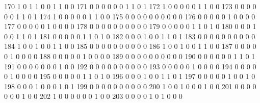 \documentclass[compress,8pt]{beamer}
\begin{document}
\begin{frame}
\begin{Schunk}
  170      1       0   1              1        0    0       1       1   0   0
  171      0       0   0              0        0    0       1       1   0   1
  172      1       0   0              0        0    0       1       1   0   0
  173      0       0   0              0        0    0       1       1   0   1
  174      1       0   0              0        0    0       1       1   0   0
  175      0       0   0              0        0    0       0       0   0   0
  176      0       0   0              0        0    1       0       0   0   0
  177      0       0   0              0        0    1       0       0   0   0
  178      0       0   0              0        0    0       0       0   0   0
  179      0       0   0              0        0    1       1       0   1   0
  180      0       0   0              1        0    0       1       1   0   1
  181      0       0   0              0        0    1       1       0   1   0
  182      0       0   0              1        0    0       1       1   0   1
  183      0       0   0              0        0    0       0       0   0   0
  184      1       0   0              1        0    0       1       1   0   0
  185      0       0   0              0        0    0       0       0   0   0
  186      1       0   0              1        0    0       1       1   0   0
  187      0       0   0              0        0    1       0       0   0   0
  188      0       0   0              0        0    1       0       0   0   0
  189      0       0   0              0        0    0       0       0   0   0
  190      0       0   0              0        0    0       1       1   0   1
  191      0       0   0              0        0    0       0       1   0   0
  192      0       0   0              0        0    0       0       0   0   0
  193      0       0   0              0        0    1       0       0   0   0
  194      0       0   0              0        0    1       0       0   0   0
  195      0       0   0              0        0    1       1       0   1   0
  196      0       0   0              1        0    0       1       1   0   1
  197      0       0   0              0        0    1       0       0   1   0
  198      0       0   0              1        0    0       0       1   0   1
  199      0       0   0              0        0    0       0       0   0   0
  200      1       0   0              1        0    0       0       1   0   0
  201      0       0   0              0        0    0       0       1   0   0
  202      1       0   0              0        0    0       0       1   0   0
  203      0       0   0              0        1    0       1       0   0   0

\end{Schunk}
\end{frame}
\end{document}
